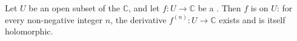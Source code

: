 \begin{corollary} \label{corollary:holomorphic_functions_on_open_subsets_of_complex_plane_are_infinitely_differentiable}
    Let $U$ be an open subset of the  $\mathbb{C}$, and let $f : U \to \mathbb{C}$ be a . Then $f$ is  on $U$: for every non-negative integer $n$, the derivative $f^{(n)} : U \to \mathbb{C}$ exists and is itself holomorphic.
\end{corollary}
